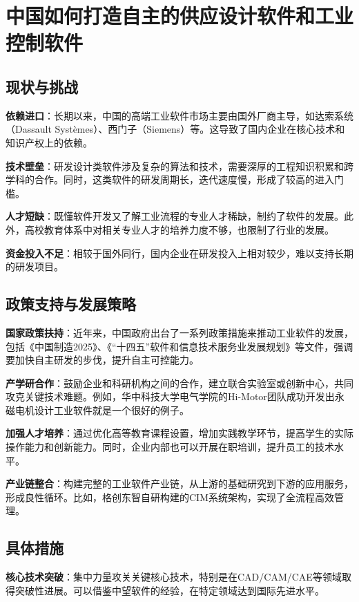 \documentclass[UTF8,a4paper]{ctexart}
\begin{document}
	\newpage

	\section{中国如何打造自主的供应设计软件和工业控制软件}
	
	\subsection{现状与挑战}
	\textbf{依赖进口}：长期以来，中国的高端工业软件市场主要由国外厂商主导，如达索系统（Dassault Systèmes）、西门子（Siemens）等。这导致了国内企业在核心技术和知识产权上的依赖。
	
	\textbf{技术壁垒}：研发设计类软件涉及复杂的算法和技术，需要深厚的工程知识积累和跨学科的合作。同时，这类软件的研发周期长，迭代速度慢，形成了较高的进入门槛。
	
	\textbf{人才短缺}：既懂软件开发又了解工业流程的专业人才稀缺，制约了软件的发展。此外，高校教育体系中对相关专业人才的培养力度不够，也限制了行业的发展。
	
	\textbf{资金投入不足}：相较于国外同行，国内企业在研发投入上相对较少，难以支持长期的研发项目。
	
	\subsection{政策支持与发展策略}
	\textbf{国家政策扶持}：近年来，中国政府出台了一系列政策措施来推动工业软件的发展，包括《中国制造2025》、《“十四五”软件和信息技术服务业发展规划》等文件，强调要加快自主研发的步伐，提升自主可控能力。
	
	\textbf{产学研合作}：鼓励企业和科研机构之间的合作，建立联合实验室或创新中心，共同攻克关键技术难题。例如，华中科技大学电气学院的Hi-Motor团队成功开发出永磁电机设计工业软件就是一个很好的例子。
	
	\textbf{加强人才培养}：通过优化高等教育课程设置，增加实践教学环节，提高学生的实际操作能力和创新能力。同时，企业内部也可以开展在职培训，提升员工的技术水平。
	
	\textbf{产业链整合}：构建完整的工业软件产业链，从上游的基础研究到下游的应用服务，形成良性循环。比如，格创东智自研构建的CIM系统架构，实现了全流程高效管理。
	
	\subsection{具体措施}
	\textbf{核心技术突破}：集中力量攻关关键核心技术，特别是在CAD/CAM/CAE等领域取得突破性进展。可以借鉴中望软件的经验，在特定领域达到国际先进水平。
	
\end{document}
